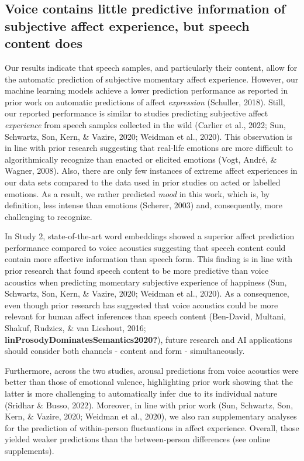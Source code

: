\documentclass[
  english,
  man,floatsintext]{apa6}
\begin{document}
\hypertarget{voice-contains-little-predictive-information-of-subjective-affect-experience-but-speech-content-does}{%
\subsection{Voice contains little predictive information of subjective affect experience, but speech content does}\label{voice-contains-little-predictive-information-of-subjective-affect-experience-but-speech-content-does}}

Our results indicate that speech samples, and particularly their content, allow for the automatic prediction of subjective momentary affect experience. However, our machine learning models achieve a lower prediction performance as reported in prior work on automatic predictions of affect \emph{expression} (Schuller, 2018). Still, our reported performance is similar to studies predicting subjective affect \emph{experience} from speech samples collected in the wild (Carlier et al., 2022; Sun, Schwartz, Son, Kern, \& Vazire, 2020; Weidman et al., 2020). This observation is in line with prior research suggesting that real-life emotions are more difficult to algorithmically recognize than enacted or elicited emotions (Vogt, André, \& Wagner, 2008). Also, there are only few instances of extreme affect experiences in our data sets compared to the data used in prior studies on acted or labelled emotions. As a result, we rather predicted \emph{mood} in this work, which is, by definition, less intense than emotions (Scherer, 2003) and, consequently, more challenging to recognize.

In Study 2, state-of-the-art word embeddings showed a superior affect prediction performance compared to voice acoustics suggesting that speech content could contain more affective information than speech form. This finding is in line with prior research that found speech content to be more predictive than voice acoustics when predicting momentary subjective experience of happiness (Sun, Schwartz, Son, Kern, \& Vazire, 2020; Weidman et al., 2020). As a consequence, even though prior research has suggested that voice acoustics could be more relevant for human affect inferences than speech content (Ben-David, Multani, Shakuf, Rudzicz, \& van Lieshout, 2016; \textbf{linProsodyDominatesSemantics2020?}), future research and AI applications should consider both channels - content and form - simultaneously.

Furthermore, across the two studies, arousal predictions from voice acoustics were better than those of emotional valence, highlighting prior work showing that the latter is more challenging to automatically infer due to its individual nature (Sridhar \& Busso, 2022). Moreover, in line with prior work (Sun, Schwartz, Son, Kern, \& Vazire, 2020; Weidman et al., 2020), we also ran supplementary analyses for the prediction of within-person fluctuations in affect experience. Overall, those yielded weaker predictions than the between-person differences (see online supplements).
\end{document}
